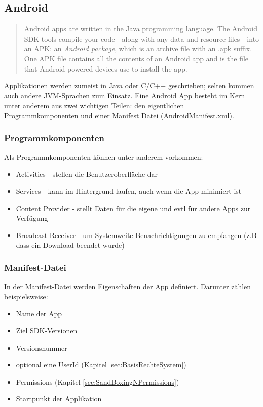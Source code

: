 \subsection{Android}\label{sec:app-android}
	\begin{quote}
	Android apps are written in the Java programming language. The Android SDK tools compile your code - along with any data and resource files - into an APK: an \textit{Android package}, which is an archive file with an .apk suffix. One APK file contains all the contents of an Android app and is the file that Android-powered devices use to install the app. \cite{AndroidApp}
	\end{quote}
	
\begin{flushleft}
	Applikationen werden zumeist in Java oder C/C++ geschrieben; selten kommen auch andere JVM-Sprachen zum Einsatz.
	Eine Android App besteht im Kern unter anderem aus zwei wichtigen Teilen: den eigentlichen Programmkomponenten und einer Manifest Datei (AndroidManifest.xml).\\
\end{flushleft}
	\subsubsection{Programmkomponenten}
	Als Programmkomponenten können unter anderem vorkommen:
	\begin{itemize}\itemsep0pt
		\item Activities - stellen die Benutzeroberfläche dar
		\item Services - kann im Hintergrund laufen, auch wenn die App minimiert ist
		\item Content Provider - stellt Daten für die eigene und evtl für andere Apps zur Verfügung
		\item Broadcast Receiver - um Systemweite Benachrichtigungen zu empfangen (z.B dass ein Download beendet wurde)
	\end{itemize}
	\subsubsection{Manifest-Datei}
	In der Manifest-Datei werden Eigenschaften der App definiert. Darunter zählen beispielsweise:
	\begin{itemize}\itemsep0pt
		\item Name der App
		\item Ziel SDK-Versionen
		\item Versionsnummer
		\item optional eine UserId (Kapitel \ref*{sec:BasisRechteSystem})
		\item Permissions (Kapitel \ref*{sec:SandBoxingNPermissions})
		\item Startpunkt der Applikation
	\end{itemize}
